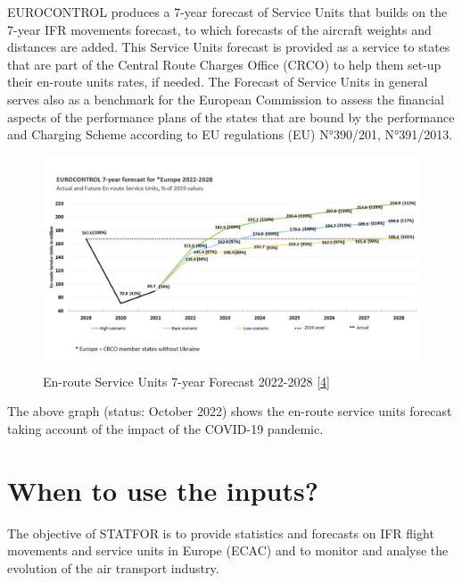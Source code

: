 \documentclass[
  11pt,
  a4paper,
]{book}
\begin{document}
EUROCONTROL produces a 7-year forecast of Service Units that builds on
the 7-year IFR movements forecast, to which forecasts of the aircraft
weights and distances are added. This Service Units forecast is provided
as a service to states that are part of the Central Route Charges Office
(CRCO) to help them set-up their en-route units rates, if needed. The
Forecast of Service Units in general serves also as a benchmark for the
European Commission to assess the financial aspects of the performance
plans of the states that are bound by the performance and Charging
Scheme according to EU regulations (EU) N°390/201, N°391/2013.

\begin{figure}

{\centering \includegraphics{./figures/forecast_service_units.png}

}

\caption{\label{fig-forecast-service-units-plot}En-route Service Units
7-year Forecast 2022-2028
\protect\hyperlink{ref-statfor:7year_forecast:2022-2028}{{[}4{]}}}

\end{figure}

The above graph (status: October 2022) shows the en-route service units
forecast taking account of the impact of the COVID-19 pandemic.

\hypertarget{when-to-use-the-inputs}{%
\section{When to use the inputs?}\label{when-to-use-the-inputs}}

The objective of STATFOR is to provide statistics and forecasts on IFR
flight movements and service units in Europe (ECAC) and to monitor and
analyse the evolution of the air transport industry.
\end{document}
